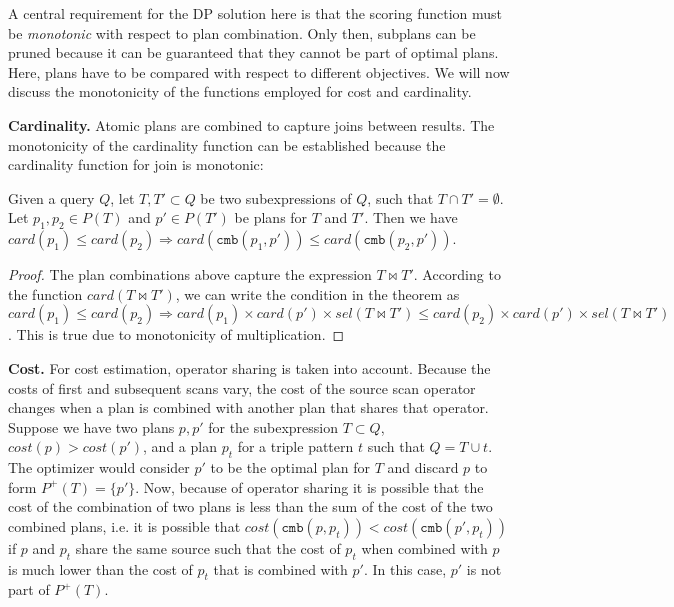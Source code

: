 A central requirement for the DP solution here is that the scoring function must be \emph{monotonic} with respect to plan combination. 
Only then, subplans can be pruned because it can be guaranteed that they cannot be part of optimal plans. Here, plans have to be compared with respect to different objectives. We will now discuss the monotonicity of the functions employed for cost and cardinality. 

\textbf{Cardinality.} Atomic plans are combined to capture joins between results. The monotonicity of the cardinality function can be established because the cardinality function for join is monotonic:

\begin{lemma}
  Given a query $Q$, let $T,T' \subset Q$ be two subexpressions of
  $Q$, such that $T \cap T' = \emptyset$. Let $p_1,p_2 \in P(T)$ and
  $p' \in P(T')$ be plans for $T$ and $T'$. Then we have $card(p_1) \leq
  card(p_2) \Rightarrow card(\mathtt{cmb}(p_1,p')) \leq
  card(\mathtt{cmb}(p_2,p'))$.
\end{lemma}
\begin{proof}
  The plan combinations above capture the expression $T \Join T'$. According to the function $card(T \Join T')$, we can write the condition in
  the theorem as $card(p_1) \leq card(p_2) \Rightarrow card(p_1)
  \times card(p') \times sel(T \Join T') \leq card(p_2) \times card(p') \times
  sel(T \Join T')$. This is true due to monotonicity of multiplication.
\end{proof}

\textbf{Cost.} For cost estimation, operator sharing is taken into
account. Because the costs of first and subsequent scans vary, the
cost of the source scan operator changes when a plan is combined with
another plan that shares that operator.
Suppose we have two plans $p,p'$ for the subexpression $T \subset Q$, $cost(p) > cost(p')$,
and a plan $p_t$ for a triple pattern $t$ such that $Q = T \cup
t$. The optimizer would consider $p'$ to
be the optimal plan for $T$ and discard $p$ to form
$P^+(T)=\{p'\}$. Now, because of operator sharing it is possible that
the cost of the combination of two plans is less than the sum of the
cost of the two combined plans, i.e. it is possible that
$cost(\mathtt{cmb}(p,p_t)) < cost(\mathtt{cmb}(p',p_t))$ if $p$ and
$p_t$ share the same source such that the cost of $p_t$ when combined
with $p$ is much lower than the cost of $p_t$ that is combined with
$p'$. In this case, $p'$ is not part of $P^+(T)$.

